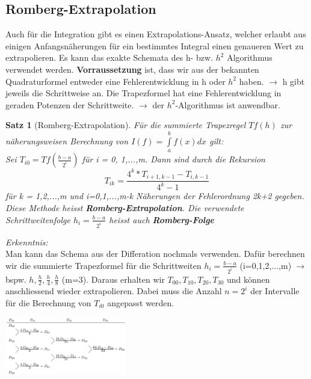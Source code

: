 \documentclass{article}
\newenvironment{Figure}
	{\par\medskip\noindent\minipage{\linewidth}}
	{\endminipage\par\medskip}
\theoremstyle{satz}
\newtheorem*{satz}{Satz}
\theoremstyle{definition}
\begin{document}
\subsection{Romberg-Extrapolation}
Auch für die Integration gibt es einen Extrapolations-Ansatz, welcher erlaubt aus einigen Anfangsnäherungen für ein bestimmtes Integral einen genaueren Wert zu extrapolieren. Es kann das exakte Schemata des h- bzw. $h^2$ Algorithmus verwendet werden.
\textbf{Vorraussetzung} ist, dass wir aus der bekannten Quadraturformel entweder eine Fehlerentwicklung in h oder $h^2$ haben. $\rightarrow$ h gibt jeweils die Schrittweise an. Die Trapezformel hat eine Fehlerentwicklung in geraden Potenzen der Schrittweite. $\rightarrow$ der $h^2$-Algorithmus ist anwendbar.
\theoremstyle{satz}
\begin{tcolorbox}
\begin{satz}[Romberg-Extrapolation]
Für die summierte Trapezregel $Tf(h)$ zur näherungsweisen Berechnung von $I(f) = \int\limits_a^bf(x)dx$ gilt:\\
Sei $T_{i0} = Tf(\frac{b-a}{2^i})$ für i = 0, 1,...,m. Dann sind durch die Rekursion
\begin{equation}
T_{ik} = \frac{4^k*T_{i+1,k-1}-T_{i,k-1}}{4^k-1}
\end{equation}
für k = 1,2,...,m und i=0,1,...,m-k Näherungen der Fehlerordnung 2k+2 gegeben. Diese Methode heisst \textbf{Romberg-Extrapolation}. Die verwendete Schrittweitenfolge $h_i=\frac{b-a}{2^i}$ heisst auch \textbf{Romberg-Folge}
\end{satz}
\end{tcolorbox}
\textit{Erkenntnis:}\\
Man kann das Schema aus der Differation nochmals verwenden. Dafür berechnen wir die summierte Trapezformel für die Schrittweiten $h_i = \frac{b-a}{2^i}$ (i=0,1,2,...,m) $\rightarrow$ bspw. $h, \frac{h}{2}, \frac{h}{4},\frac{h}{8}$ (m=3). Daraus erhalten wir $T_{00},T_{10},T_{20},T_{30}$ und können anschliessend wieder extrapolieren. Dabei muss die Anzahl $n=2^i$ der Intervalle für die Berechnung von $T_{i0}$ angepasst werden.
\begin{Figure}
\centering
\includegraphics[width=200px]{img/RombergExtrapolation.png}
	\label{fig:Schema für Romberg Extrapolation}
\end{Figure}
\end{document}
